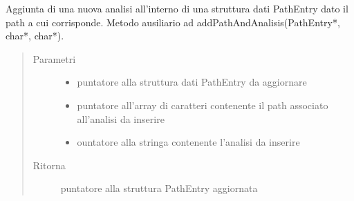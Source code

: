 \documentclass[letterpaper,10pt,italian,openany,oneside]{sphinxmanual}
\begin{document}
\begin{fulllineitems}
\label{\detokenize{code/datastructure:c.addAnalisis}}
Aggiunta di una nuova analisi all’interno di una struttura dati PathEntry dato il path a cui corrisponde.
Metodo ausiliario ad addPathAndAnalisis(PathEntry*, char*, char*).
\begin{quote}\begin{description}
\item[{Parametri}] \leavevmode\begin{itemize}
\item {} 
 \textendash{} puntatore alla struttura dati PathEntry da aggiornare

\item {} 
 \textendash{} puntatore all’array di caratteri contenente il path associato all’analisi da inserire

\item {} 
 \textendash{} ountatore alla stringa contenente l’analisi da inserire

\end{itemize}

\item[{Ritorna}] \leavevmode
puntatore alla struttura PathEntry aggiornata

\end{description}\end{quote}

\end{fulllineitems}

\end{document}
